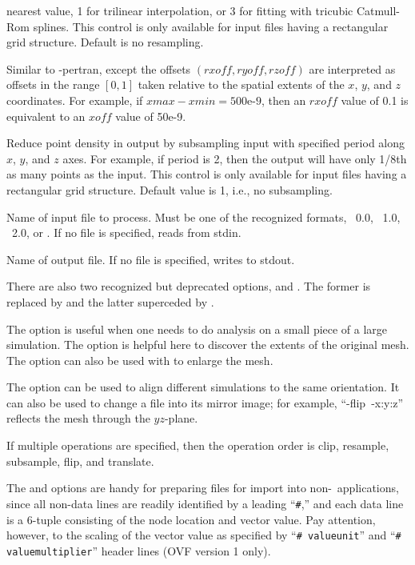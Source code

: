 \begin{description}
  nearest value, 1 for trilinear interpolation, or 3 for fitting with
  tricubic Catmull-Rom splines.  This control is only available for
  input files having a rectangular grid structure.  Default is no
  resampling.
\item[\optkey{-rpertran rxoff ryoff rzoff}]
  Similar to -pertran, except the offsets
  $(\mathit{rxoff},\mathit{ryoff},\mathit{rzoff})$ are
  interpreted as offsets in the range $[0,1]$ taken relative to the
  spatial extents of the $x$, $y$, and $z$ coordinates.  For example, if
  $\mathit{xmax} - \mathit{xmin} = \mbox{500e-9}$, then an
  $\mathit{rxoff}$ value of 0.1 is equivalent
  to an $\mathit{xoff}$ value of 50e-9.
\item[\optkey{-subsample period}]
  Reduce point density in output by subsampling input with specified
  period along $x$, $y$, and $z$ axes.  For example, if period is 2,
  then the output will have only 1/8th as many points as the input.
  This control is only available for input files having a rectangular
  grid structure.  Default value is 1, i.e., no subsampling.
\item[\optkey{infile}]
  Name of input file to process.  Must be one of the recognized
  formats, \OVF\ 0.0, \OVF\ 1.0, \OVF\ 2.0, or \VIO.  If no file is
  specified, reads from stdin.
\item[\optkey{outfile}]
  Name of output file.  If no file is specified, writes to stdout.
\end{description}

There are also two recognized but deprecated options,
 and . The former is replaced by
 and the latter superceded by .

The  option is useful when one needs to do analysis on a
small piece of a large simulation.  The  option is helpful
here to discover the extents of the original mesh.  The 
option can also be used with  to enlarge the mesh.

The  option can be used to align different simulations
to the same orientation.  It can also be used to change a file into its
mirror image; for example, ``-flip~-x:y:z'' reflects the mesh through
the $yz$-plane.

If multiple operations are specified, then the operation order is
clip, resample, subsample, flip, and translate.

The  and  options are handy for
preparing files for import into non-\OOMMF\ applications, since all
non-data lines are readily identified by a leading ``\verb+#+,'' and
each data line is a 6-tuple consisting of the node location and vector
value.  Pay attention, however, to the scaling of the vector value as
specified by ``\verb+# valueunit+'' and ``\verb+# valuemultiplier+''
header lines (OVF version 1 only).

